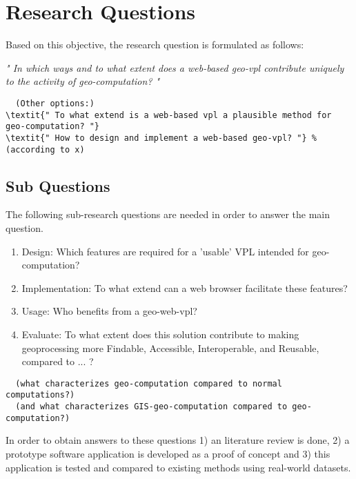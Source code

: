 \section{Research Questions}
Based on this objective, the research question is formulated as follows: 

\textit{" In which ways and to what extent does a web-based geo-vpl contribute uniquely to the activity of geo-computation? "} %


\begin{lstlisting}
  (Other options:)
\textit{" To what extend is a web-based vpl a plausible method for geo-computation? "} 
\textit{" How to design and implement a web-based geo-vpl? "} % (according to x)
\end{lstlisting}



\subsection*{Sub Questions}
The following sub-research questions are needed in order to answer the main question. 

\begin{enumerate}[a]
  \item Design: Which features are required for a 'usable' VPL intended for geo-computation? 
  \item Implementation: To what extend can a web browser facilitate these features?
  \item Usage: Who benefits from a geo-web-vpl? 
  \item Evaluate: To what extent does this solution contribute to making geoprocessing more Findable, Accessible, Interoperable, and Reusable, compared to ... ?  
\end{enumerate}

\begin{lstlisting}
  (what characterizes geo-computation compared to normal computations?)
  (and what characterizes GIS-geo-computation compared to geo-computation?)
\end{lstlisting}


In order to obtain answers to these questions 
1) an literature review is done, 
2) a prototype software application is developed as a proof of concept and 
3) this application is tested and compared to existing methods using real-world datasets.

